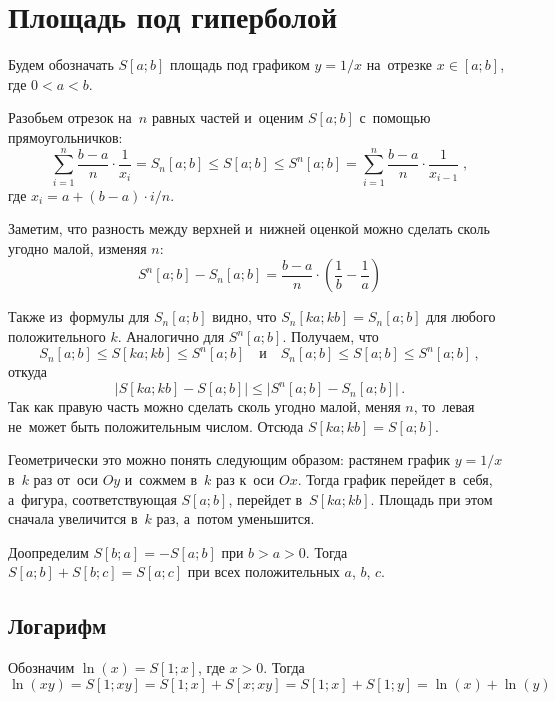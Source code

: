 
\section*{Площадь под гиперболой}


\begingroup
    \def\abs#1{\lvert #1 \rvert}%

Будем обозначать $S[a; b]$ площадь под графиком $y = 1 / x$
на~отрезке $x \in [a; b]$, где $0 < a < b$.

Разобьем отрезок на~$n$ равных частей и~оценим $S[a; b]$ с~помощью
прямоугольничков:
\[
    \sum_{i=1}^{n}
        \frac{b - a}{n} \cdot \frac{1}{x_{i}}
=
    S_{n}[a; b]
\leq
    S[a; b]
\leq
    S^{n}[a; b]
=
    \sum_{i=1}^{n}
        \frac{b - a}{n} \cdot \frac{1}{x_{i-1}}
\; , \]
где $x_{i} = a + (b - a) \cdot i / n$.

Заметим, что разность между верхней и~нижней оценкой можно сделать сколь угодно
малой, изменяя $n$:
\[
    S^{n}[a; b] - S_{n}[a; b]
=
    \frac{b - a}{n} \cdot \left( \frac{1}{b} - \frac{1}{a} \right)
\]

Также из~формулы для $S_{n}[a; b]$ видно, что $S_{n}[ka; kb] = S_{n}[a; b]$
для любого положительного $k$.
Аналогично для $S^{n}[a; b]$.
Получаем, что
\[
    S_{n}[a; b] \leq S[ka; kb] \leq S^{n}[a; b]
\quad\text{и}\quad
    S_{n}[a; b] \leq S[a; b] \leq S^{n}[a; b]
\, , \]
откуда
\[
    \abs{S[ka; kb] - S[a; b]} \leq \abs{S^{n}[a; b] - S_{n}[a; b]}
\, . \]
Так как правую часть можно сделать сколь угодно малой, меняя $n$, то~левая
не~может быть положительным числом.
Отсюда $S[ka; kb] = S[a; b]$.

Геометрически это можно понять следующим образом: растянем график $y = 1/x$
в~$k$ раз от~оси $Oy$ и~сожмем в~$k$ раз к~оси $Ox$.
Тогда график перейдет в~себя, а~фигура, соответствующая $S[a; b]$, перейдет
в~$S[ka; kb]$.
Площадь при этом сначала увеличится в~$k$ раз, а~потом уменьшится.

Доопределим $S[b; a] = - S[a; b]$ при $b > a > 0$.
Тогда $S[a; b] + S[b; c] = S[a; c]$ при всех положительных $a$, $b$, $c$.

\subsection*{Логарифм}

Обозначим $\ln(x) = S[1; x]$, где $x > 0$.
Тогда
\[
    \ln(x y)
=
    S[1; x y]
=
    S[1; x] + S[x; x y]
=
    S[1; x] + S[1; y]
=
    \ln(x) + \ln(y)
\]

